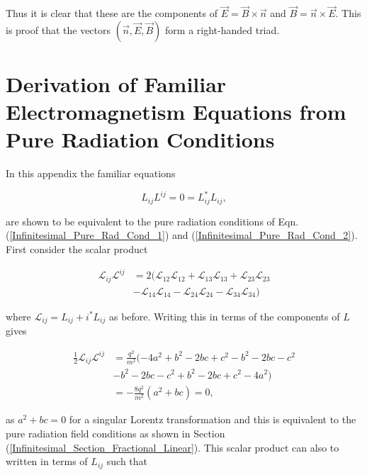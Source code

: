 \begin{appendix}
\noindent Thus it is clear that these are the components of $\vec{E} = \vec{B} \times \vec{n}$ and $\vec{B} = \vec{n} \times \vec{E}$. This is proof that the vectors $(\vec{n}, \vec{E}, \vec{B})$ form a right-handed triad. 

\section{Derivation of Familiar Electromagnetism Equations from Pure Radiation Conditions}\label{Appendix_Familair_EM_from_Pure_Cond}

In this appendix the familiar equations \cite[p. 42]{Schild_Lectures}

\begin{equation*}
L_{ij}L^{ij} = 0 = L_{ij} ^{*}L_{ij},
\end{equation*}

\noindent are shown to be equivalent to the pure radiation conditions of Eqn.(\ref{Infinitesimal_Pure_Rad_Cond_1}) and (\ref{Infinitesimal_Pure_Rad_Cond_2}). First consider the scalar product

\begin{align*}
\mathcal{L}_{ij} \mathcal{L}^{ij} & = 2( \mathcal{L}_{12}\mathcal{L}_{12}+\mathcal{L}_{13} \mathcal{L}_{13}+\mathcal{L}_{23}\mathcal{L}_{23} \\
                                  & - \mathcal{L}_{14} \mathcal{L}_{14} - \mathcal{L}_{24}\mathcal{L}_{24} - \mathcal{L}_{34}\mathcal{L}_{34})
\end{align*}

\noindent where $\mathcal{L}_{ij} = L_{ij} + i ^{*}L_{ij}$ as before. Writing this in terms of the components of $L$ gives

\begin{align*}
\frac{1}{2} \mathcal{L}_{ij} \mathcal{L}^{ij} & = \frac{q^2}{m^2} ( -4a^2 + b^2 - 2bc + c^2 - b^2 - 2bc - c^2 \\
                                              & - b^2 - 2bc - c^2 + b^2 - 2bc + c^2 - 4a^2) \\
                                              & = -\frac{8q^2}{m^2} (a^2 + bc) = 0,  
\end{align*}

\noindent as $a^2 + bc = 0$ for a singular Lorentz transformation and this is equivalent to the pure radiation field conditions as shown in Section (\ref{Infinitesimal_Section_Fractional_Linear}). This scalar product can also to written in terms of $L_{ij}$ such that


\end{appendix}
